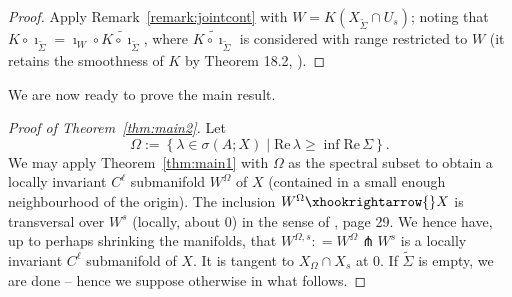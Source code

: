 \documentclass[a4paper, 12pt, oneside, reqno, notitlepage]{amsart}
\theoremstyle{plain}
\theoremstyle{definition}
\theoremstyle{remark}
\begin{document}
\begin{proof}
    Apply Remark~\ref{remark:jointcont} with $W = K(X_{\widetilde{\Sigma}} \cap U_s)$; noting that $ K \circ \imath_{\widetilde{\Sigma}} = \imath_W \circ \widetilde{K \circ \imath_{\widetilde{\Sigma}}}$, where $\widetilde{K \circ \imath_{\widetilde{\Sigma}}}$ is considered with range restricted to $W$ (it retains the smoothness of $K$ by Theorem 18.2, \cite{munkres2000topology}).
\end{proof}



We are now ready to prove the main result.

\begin{proof}[Proof of Theorem~\ref{thm:main2}]
    Let
    \begin{displaymath}
        \Omega := \left\{ \lambda \in \sigma(A;X) \; | \; \mathrm{Re} \, \lambda \geq \inf \mathrm{Re} \, \Sigma \right\}.
    \end{displaymath}
    We may apply Theorem~\ref{thm:main1} with $\Omega$ as the spectral subset to obtain a locally invariant $C^\ell$ submanifold $W^\Omega$ of $X$ (contained in a small enough neighbourhood of the origin).
    The inclusion $W^\Omega \xhookrightarrow{} X$ is transversal over $W^s$ (locally, about $0$) 
    in the sense of \cite{lang2012fundamentals}, page 29.
    We hence have, up to perhaps shrinking the manifolds, that $W^{\Omega,s} : = W^\Omega \pitchfork W^s$ is a locally invariant $C^\ell$ submanifold of $X$.
    It is tangent to $X_\Omega \cap X_s$ at $0$. 
    If $\widetilde{\Sigma}$ is empty, we are done -- hence we suppose otherwise in what follows.


\end{proof}
\end{document}
